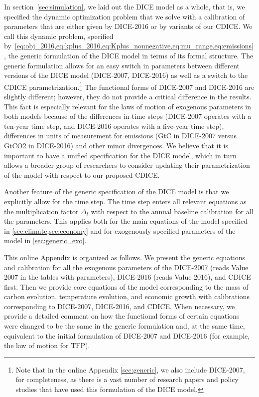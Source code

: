\documentclass[11pt, a4paper, pdftex, twoside, dvipsnames]{article}
\renewcommand{\ref}{\cref}
\begin{document}
\begin{appendices}
In section~\ref{sec:simulation}, we laid out the DICE model as a whole, that is, we specified the dynamic optimization problem that we solve with a calibration of parameters that are either given by DICE-2016 or by variants of our CDICE. We call this dynamic problem, specified  by~\cref{eq:obj_2016,eq:kplus_2016,eq:Kplus_nonnegative,eq:mu_range,eq:emissions}, the generic formulation of the DICE model in terms of its formal structure. The generic formulation allows for an easy switch in parameters between different versions of the DICE model (DICE-2007, DICE-2016) as well as a switch to the CDICE parametrization.\footnote{Note that in the online Appendix \cref{sec:generic}, we also include DICE-2007, for completeness, as there is a vast number of research papers and policy studies that have used this formulation of the DICE model.} The functional forms of DICE-2007 and DICE-2016 are slightly different; however, they do not provide a critical difference in the results. This fact is especially relevant for the laws of motion of exogenous parameters in both models because of the differences in time steps (DICE-2007 operates with a ten-year time step, and DICE-2016 operates with a five-year time step), differences in units of measurement for emissions (GtC in DICE-2007 versus GtCO2 in DICE-2016) and other minor divergences. We believe that it is important to have a unified specification for the DICE model, which in turn allows a broader group of researchers to consider updating their parametrization of the model with respect to our proposed CDICE.

Another feature of the generic specification of the DICE model is that we explicitly allow for the time step. The time step enters all relevant equations as the multiplication factor $\Delta_t$ with respect to the annual baseline calibration for all the parameters. This applies both for the main equations of the model specified in \cref{sec:climate,sec:economy} and for exogenously specified parameters of the model in \cref{sec:generic_exo}.

This online Appendix is organized as follows. We present the generic equations and calibration for all the exogenous parameters of the DICE-2007 (reads Value 2007 in the tables with parameters), DICE-2016 (reads Value 2016), and CDICE first. Then we provide core equations of the model corresponding to the mass of carbon evolution, temperature evolution, and economic growth with calibrations corresponding to DICE-2007, DICE-2016, and CDICE. When necessary, we provide a detailed comment on how the functional forms of certain equations were changed to be the same in the generic formulation and, at the same time, equivalent to the initial formulation of DICE-2007 and DICE-2016 (for example, the law of motion for TFP). 





\end{appendices}
\end{document}
